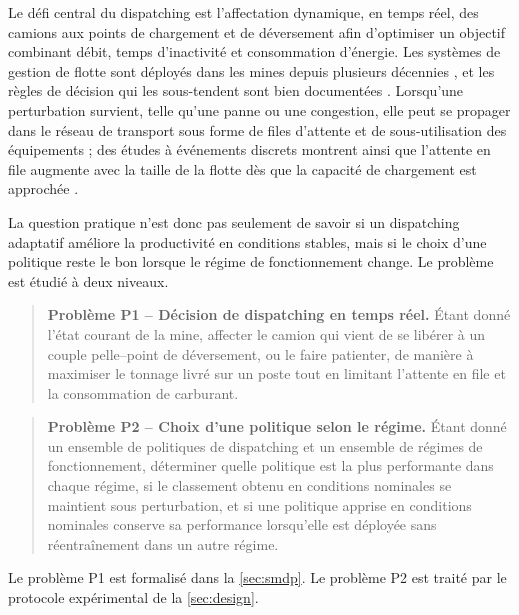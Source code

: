 \documentclass[11pt,a4paper]{article}
\newif\ifrevmarks
\newcommand{\revtag}[1]{\ifrevmarks\textsuperscript{\textcolor{red!70!black}{\scriptsize[#1]}}\fi}
\newenvironment{revbloc}[1]{\par\ifrevmarks\color{revcolor}\noindent\revtag{#1}\ \fi}{\par}
\begin{document}
\begin{revbloc}{M24}
Le défi central du dispatching est l'affectation dynamique, en temps réel, des camions aux points de chargement et de déversement afin d'optimiser un objectif combinant débit, temps d'inactivité et consommation d'énergie. Les systèmes de gestion de flotte sont déployés dans les mines depuis plusieurs décennies \cite{Afrapoli2017, AlexandraNewman2010}, et les règles de décision qui les sous-tendent sont bien documentées \cite{MohanMunirathinam1994, Alarie2002}. Lorsqu'une perturbation survient, telle qu'une panne ou une congestion, elle peut se propager dans le réseau de transport sous forme de files d'attente et de sous-utilisation des équipements ; des études à événements discrets montrent ainsi que l'attente en file augmente avec la taille de la flotte dès que la capacité de chargement est approchée \cite{Zeng2022, NecmettinCetin2004}.

La question pratique n'est donc pas seulement de savoir si un dispatching adaptatif améliore la productivité en conditions stables, mais si le choix d'une politique reste le bon lorsque le régime de fonctionnement change. Le problème est étudié à deux niveaux.

\begin{quote}
\textbf{Problème P1 -- Décision de dispatching en temps réel.}
Étant donné l'état courant de la mine, affecter le camion qui vient de se libérer à un couple pelle--point de déversement, ou le faire patienter, de manière à maximiser le tonnage livré sur un poste tout en limitant l'attente en file et la consommation de carburant.
\end{quote}

\begin{quote}
\textbf{Problème P2 -- Choix d'une politique selon le régime.}
Étant donné un ensemble de politiques de dispatching et un ensemble de régimes de fonctionnement, déterminer quelle politique est la plus performante dans chaque régime, si le classement obtenu en conditions nominales se maintient sous perturbation, et si une politique apprise en conditions nominales conserve sa performance lorsqu'elle est déployée sans réentraînement dans un autre régime.
\end{quote}

Le problème P1 est formalisé dans la \cref{sec:smdp}. Le problème P2 est traité par le protocole expérimental de la \cref{sec:design}.
\end{revbloc}

\end{document}
